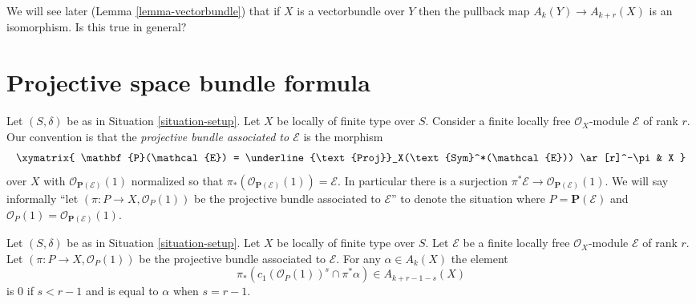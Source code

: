 \begin{remark}
\label{remark-when-isomorphism}
We will see later (Lemma \ref{lemma-vectorbundle})
that if $X$ is a vectorbundle over $Y$ then
the pullback map $A_k(Y) \to A_{k + r}(X)$ is an isomorphism.
Is this true in general?
\end{remark}








\section{Projective space bundle formula}
\label{section-projective-space-bundle-formula}

\noindent
Let $(S, \delta)$ be as in Situation \ref{situation-setup}.
Let $X$ be locally of finite type over $S$.
Consider a finite locally free $\mathcal{O}_X$-module
$\mathcal{E}$ of rank $r$.
Our convention is that the {\it projective bundle associated to
$\mathcal{E}$} is the morphism
$$
\xymatrix{
\mathbf{P}(\mathcal{E}) =
\underline{\text{Proj}}_X(\text{Sym}^*(\mathcal{E}))
\ar[r]^-\pi
& X
}
$$
over $X$ with
$\mathcal{O}_{\mathbf{P}(\mathcal{E})}(1)$ normalized so that
$\pi_*(\mathcal{O}_{\mathbf{P}(\mathcal{E})}(1)) = \mathcal{E}$.
In particular there is a surjection
$\pi^*\mathcal{E} \to \mathcal{O}_{\mathbf{P}(\mathcal{E})}(1)$.
We will say informally ``let $(\pi : P \to X, \mathcal{O}_P(1))$
be the projective bundle associated to $\mathcal{E}$'' to denote
the situation where $P = \mathbf{P}(\mathcal{E})$ and
$\mathcal{O}_P(1) = \mathcal{O}_{\mathbf{P}(\mathcal{E})}(1)$.

\begin{lemma}
\label{lemma-cap-projective-bundle}
Let $(S, \delta)$ be as in Situation \ref{situation-setup}.
Let $X$ be locally of finite type over $S$.
Let $\mathcal{E}$ be a finite locally free $\mathcal{O}_X$-module
$\mathcal{E}$ of rank $r$. Let $(\pi : P \to X, \mathcal{O}_P(1))$
be the projective bundle associated to $\mathcal{E}$.
For any $\alpha \in A_k(X)$ the element
$$
\pi_*\left(
c_1(\mathcal{O}_P(1))^s \cap \pi^*\alpha
\right)
\in
A_{k + r - 1 - s}(X)
$$
is $0$ if $s < r - 1$ and is equal to $\alpha$ when $s = r - 1$.
\end{lemma}

